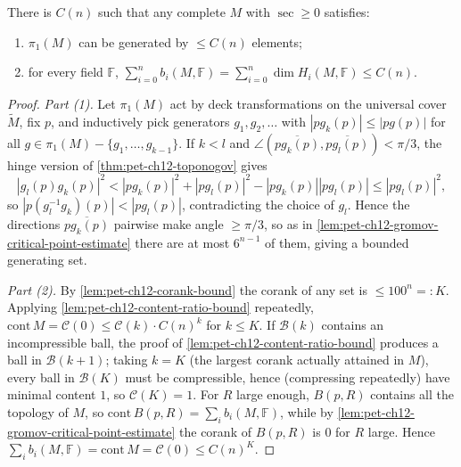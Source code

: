 \begin{theorem}
  \label{thm:pet-ch12-betti-number-finiteness}
  There is $C(n)$ such that any complete $M$ with $\sec\ge0$ satisfies:
  \begin{enumerate}
    \item $\pi_1(M)$ can be generated by $\le C(n)$ elements;
    \item for every field $\mathbb{F}$,
      $\sum_{i=0}^n b_i(M,\mathbb{F})=\sum_{i=0}^n\dim H_i(M,\mathbb{F})\le C(n)$.
  \end{enumerate}
\end{theorem}
\begin{proof}
  \emph{Part (1).} Let $\pi_1(M)$ act by deck transformations on the universal
  cover $\tilde M$, fix $p$, and inductively pick generators $g_1,g_2,\dots$
  with $|pg_k(p)|\le|pg(p)|$ for all $g\in\pi_1(M)-\{g_1,\dots,g_{k-1}\}$. If
  $k<l$ and $\angle(\overline{pg_k(p)},\overline{pg_l(p)})<\pi/3$, the hinge
  version of \cref{thm:pet-ch12-toponogov} gives
  \[
    |g_l(p)g_k(p)|^2<|pg_k(p)|^2+|pg_l(p)|^2-|pg_k(p)||pg_l(p)|\le|pg_l(p)|^2,
  \]
  so $|p(g_l^{-1}g_k)(p)|<|pg_l(p)|$, contradicting the choice of $g_l$. Hence
  the directions $\overline{pg_k(p)}$ pairwise make angle $\ge\pi/3$, so as in
  \cref{lem:pet-ch12-gromov-critical-point-estimate} there are at most
  $6^{n-1}$ of them, giving a bounded generating set.

  \emph{Part (2).} By \cref{lem:pet-ch12-corank-bound} the corank of any set is
  $\le100^n=:K$. Applying \cref{lem:pet-ch12-content-ratio-bound} repeatedly,
  $\mathrm{cont}\,M=\mathcal{C}(0)\le\mathcal{C}(k)\cdot C(n)^k$ for $k\le K$. If
  $\mathcal{B}(k)$ contains an incompressible ball, the proof of
  \cref{lem:pet-ch12-content-ratio-bound} produces a ball in $\mathcal{B}(k+1)$;
  taking $k=K$ (the largest corank actually attained in $M$), every ball in
  $\mathcal{B}(K)$ must be compressible, hence (compressing repeatedly) have
  minimal content $1$, so $\mathcal{C}(K)=1$. For $R$ large enough,
  $B(p,R)$ contains all the topology of $M$, so
  $\mathrm{cont}\,B(p,R)=\sum_ib_i(M,\mathbb{F})$, while by
  \cref{lem:pet-ch12-gromov-critical-point-estimate} the corank of $B(p,R)$ is
  $0$ for $R$ large. Hence
  $\sum_ib_i(M,\mathbb{F})=\mathrm{cont}\,M=\mathcal{C}(0)\le C(n)^K$.
\end{proof}

